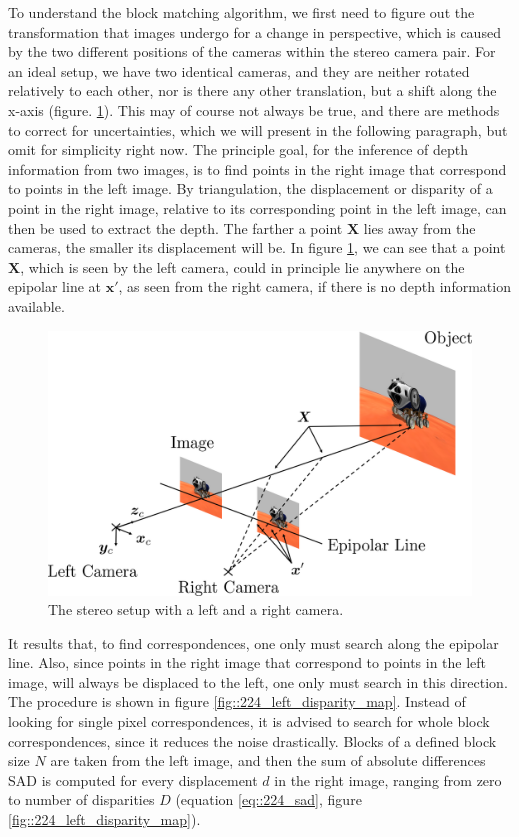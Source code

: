 To understand the block matching algorithm, we first need to figure out the transformation that images undergo for a change in perspective, which is caused by the two different positions of the cameras within the stereo camera pair. For an ideal setup, we have two identical cameras, and they are neither rotated relatively to each other, nor is there any other translation, but a shift along the x-axis (figure. \ref{fig::224_stereo_camera}). This may of course not always be true, and there are methods to correct for uncertainties, which we will present in the following paragraph, but omit for simplicity right now. The principle goal, for the inference of depth information from two images, is to find points in the right image that correspond to points in the left image. By triangulation, the displacement or disparity of a point in the right image, relative to its corresponding point in the left image, can then be used to extract the depth. The farther a point $\bm{X}$ lies away from the cameras, the smaller its displacement will be. In figure \ref{fig::224_stereo_camera}, we can see that a point $\bm{X}$, which is seen by the left camera, could in principle lie anywhere on the epipolar line at $\bm{x}'$, as seen from the right camera, if there is no depth information available. 
\begin{figure}[h!]
	\centering
	\includegraphics[scale=.28]{chapters/02_background/img/stereo_camera.png}
	\caption{The stereo setup with a left and a right camera.}
	\label{fig::224_stereo_camera}
\end{figure}
It results that, to find correspondences, one only must search along the epipolar line. Also, since points in the right image that correspond to points in the left image, will always be displaced to the left, one only must search in this direction. The procedure is shown in figure \ref{fig::224_left_disparity_map}. Instead of looking for single pixel correspondences, it is advised to search for whole block correspondences, since it reduces the noise drastically. Blocks of a defined block size $N$ are taken from the left image, and then the sum of absolute differences SAD is computed for every displacement $d$ in the right image, ranging from zero to number of disparities $D$ (equation \ref{eq::224_sad}, figure \ref{fig::224_left_disparity_map}).
